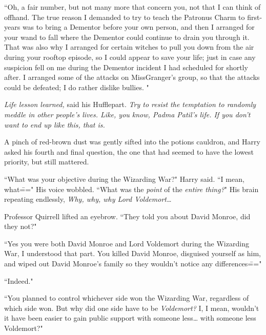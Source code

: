 ``Oh, a fair number, but not many more that concern you, not that I can think of offhand. The true reason I demanded to try to teach the Patronus Charm to first-years was to bring a Dementor before your own person, and then I arranged for your wand to fall where the Dementor could continue to drain you through it.  That was also why I arranged for certain witches to pull you down from the air during your rooftop episode, so I could appear to save your life; just in case any suspicion fell on me during the Dementor incident I had scheduled for shortly after.  I arranged some of the attacks on Miss\?Granger's group, so that the attacks could be defeated; I do rather dislike bullies. "

\emph{Life lesson learned,} said his Hufflepart. \emph{Try to resist the temptation to randomly meddle in other people's lives. Like, you know, Padma Patil's life. If you don't want to end up like this, that is.}

A pinch of red-brown dust was gently sifted into the potions cauldron, and Harry asked his fourth and final question, the one that had seemed to have the lowest priority, but still mattered.

``What was your objective during the Wizarding War?" Harry said. ``I mean, what\===" His voice wobbled. ``What was the \emph{point} of the \emph{entire thing?}" His brain repeating endlessly, \emph{Why, why, why Lord Voldemort{\ldots}}

Professor Quirrell lifted an eyebrow. ``They told you about David Monroe, did they not?"

``Yes you were both David Monroe and Lord Voldemort during the Wizarding War, I understood that part. You killed David Monroe, disguised yourself as him, and wiped out David Monroe's family so they wouldn't notice any differences\==="

``Indeed."

``You planned to control whichever side won the Wizarding War, regardless of which side won. But why did one side have to be \emph{Voldemort?} I, I mean, wouldn't it have been easier to gain public support with someone less{\ldots} with someone less Voldemort?"

